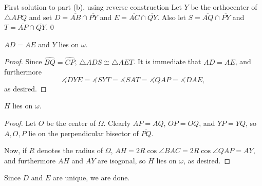 \begin{customenv}{First solution to part (b), using reverse construction}
    Let $Y$ be the orthocenter of $\triangle APQ$ and set $D=\overline{AB}\cap\overline{PY}$ and $E=\overline{AC}\cap\overline{QY}$. Also let $S=\overline{AQ}\cap\overline{PY}$ and $T=\overline{AP}\cap\overline{QY}$.
    \setcounter{iclaim}0
    \begin{iclaim}
        $AD=AE$ and $Y$ lies on $\omega$.
    \end{iclaim}
    \begin{proof}
        Since $\widehat{BQ}=\widehat{CP}$, $\triangle ADS\cong\triangle AET$. It is immediate that $AD=AE$, and furthermore $$\measuredangle DYE=\measuredangle SYT=\measuredangle SAT=\measuredangle QAP=\measuredangle DAE,$$
        as desired.
    \end{proof}
    \begin{iclaim}
        $H$ lies on $\omega$.
    \end{iclaim}
    \begin{proof}
        Let $O$ be the center of $\Omega$. Clearly $AP=AQ$, $OP=OQ$, and $YP=YQ$, so $A,O,P$ lie on the perpendicular bisector of $\overline{PQ}$.

        Now, if $R$ denotes the radius of $\Omega$, $AH=2R\cos\angle BAC=2R\cos\angle QAP=AY$, and furthermore $\overline{AH}$ and $\overline{AY}$ are isogonal, so $H$ lies on $\omega$, as desired.
    \end{proof}

    Since $D$ and $E$ are unique, we are done. 
\end{customenv}
